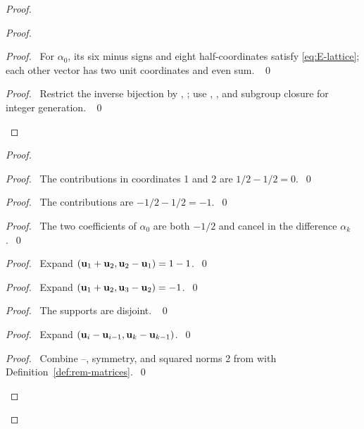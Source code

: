 \begin{proof}
\begin{proof}
\begin{proof}\pf\ For $\alpha_0$, its six minus signs and eight
half-coordinates satisfy \eqref{eq:E-lattice}; each other vector has
two unit coordinates and even sum. ~\qed\end{proof}
\qedstep
\begin{proof}\pf\ Restrict the inverse bijection 
by , ; use ,
, and subgroup closure for integer generation. ~\qed\end{proof}
\end{proof}
\begin{proof}
\begin{proof}\pf\ The contributions in coordinates 1 and 2 are
$1/2-1/2=0$.~\qed\end{proof}
\begin{proof}\pf\ The contributions are $-1/2-1/2=-1$.~\qed\end{proof}
\begin{proof}\pf\ The two coefficients of $\alpha_0$ are both $-1/2$
and cancel in the difference $\alpha_k$.~\qed\end{proof}
\begin{proof}\pf\ Expand $({\mathbf u}_1+{\mathbf u}_2,{\mathbf u}_2-{\mathbf u}_1)=1-1$.~\qed\end{proof}
\begin{proof}\pf\ Expand $({\mathbf u}_1+{\mathbf u}_2,{\mathbf u}_3-{\mathbf u}_2)=-1$.~\qed\end{proof}
\begin{proof}\pf\ The supports are disjoint. ~\qed\end{proof}
\begin{proof}\pf\ Expand $({\mathbf u}_i-{\mathbf u}_{i-1},{\mathbf u}_k-{\mathbf u}_{k-1})$.~\qed\end{proof}
\qedstep
\begin{proof}\pf\ Combine --,
symmetry, and squared norms 2 from  with
Definition~\ref{def:rem-matrices}.~\qed\end{proof}
\end{proof}
\end{proof}
